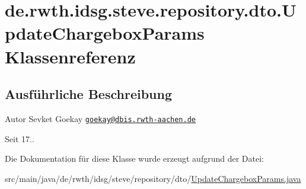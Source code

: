 \hypertarget{classde_1_1rwth_1_1idsg_1_1steve_1_1repository_1_1dto_1_1_update_chargebox_params}{\section{de.\+rwth.\+idsg.\+steve.\+repository.\+dto.\+Update\+Chargebox\+Params Klassenreferenz}
\label{classde_1_1rwth_1_1idsg_1_1steve_1_1repository_1_1dto_1_1_update_chargebox_params}
}


\subsection{Ausführliche Beschreibung}
\begin{DoxyAuthor}{Autor}
Sevket Goekay \href{mailto:goekay@dbis.rwth-aachen.de}{\tt goekay@dbis.\+rwth-\/aachen.\+de} 
\end{DoxyAuthor}
\begin{DoxySince}{Seit}
17.. 
\end{DoxySince}


Die Dokumentation für diese Klasse wurde erzeugt aufgrund der Datei\+:\begin{DoxyCompactItemize}
\item 
src/main/java/de/rwth/idsg/steve/repository/dto/\hyperlink{_update_chargebox_params_8java}{Update\+Chargebox\+Params.\+java}\end{DoxyCompactItemize}
